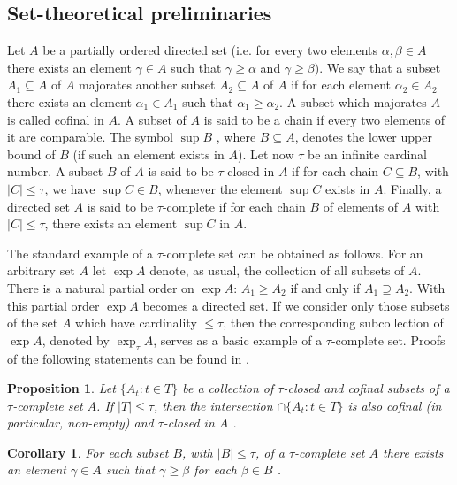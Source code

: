 \documentclass[12pt,draft]{amsart}
\theoremstyle{plain}
\newtheorem{cor}[thm]{Corollary}
\newtheorem{pro}[thm]{Proposition}
\theoremstyle{definition}
\numberwithin{equation}{section}
\begin{document}
\subsection{Set-theoretical preliminaries}\label{SS:set}
Let $A$  be a partially ordered directed set (i.e.
for every two elements  $\alpha ,\beta \in A$  there exists
an element  $\gamma \in A$  such that  $\gamma \geq \alpha$ 
and  $\gamma \geq \beta$). We say that a subset
$A_1 \subseteq A$ of $A$ majorates another subset
$A_2 \subseteq A$ of $A$ if for each element $\alpha_2 \in A_2$
there exists an element $\alpha_1 \in A_1$ such that
$\alpha_1 \geq \alpha_2$. A subset which majorates $A$
is called cofinal in $A$. A subset of  $A$  is said to
be a chain if every two elements of it are comparable.
The symbol $\sup B$ , where  $B \subseteq A$, denotes the
lower upper bound of $B$ (if such an element exists in $A$).
Let now $\tau$ be an infinite cardinal number. A subset $B$
of $A$  is said to be $\tau$-closed in $A$ if for each chain
$C \subseteq B$, with ${\mid}C{\mid} \leq \tau$, we have
$\sup C \in B$, whenever the element $\sup C$ exists in $A$.
Finally, a directed set $A$ is said to be $\tau$-complete
if for each chain $B$ of elements of $A$ with
${\mid}C{\mid} \leq \tau$, there exists an element
$\sup C$ in $A$. 

The standard example of a $\tau$-complete set can be obtained
as follows. For an arbitrary set $A$ let $\exp A$ denote, as usual,
the collection of all subsets of $A$. There is a natural partial
order on $\exp A$: $A_1 \geq A_2$ if and only if $A_1 \supseteq A_2$.
With this partial order $\exp A$ becomes a directed set.
If we consider only those subsets of the set $A$ which have
cardinality $\leq \tau$, then the corresponding subcollection
of $\exp A$, denoted by $\exp_{\tau}A$, serves as a basic
example of a $\tau$-complete set. Proofs of the following
statements can be found in \cite{chibook96}.

\begin{pro}\label{P:3.1.1}
Let  $\{ A_{t} : t \in T \}$ be a collection of $\tau$-closed and
cofinal subsets of a $\tau$-complete set $A$. If
$\mid T\mid \leq \tau$, then the intersection
$\cap \{ A_{t}: t \in T \}$ is also cofinal
(in particular, non-empty) and $\tau$-closed in $A$ .
\end{pro}


\begin{cor}\label{C:3.1.2}
For each subset $B$, with  $\mid B \mid \leq \tau$, of a
$\tau$-complete set $A$ there exists an element $\gamma \in A$
such that  $\gamma \geq \beta$  for each  $\beta \in B$ .
\end{cor}
\end{document}
